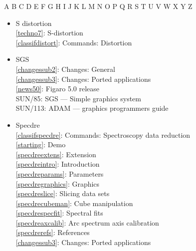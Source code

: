 \documentclass[11pt,twoside]{article}
\newcommand{\htmlref}[2]{#1}
\newcommand{\xref}[3]{#1}
\newcommand{\idxint}[2]{\ref{#1}: \htmlref{#2}{#1}}
\newcommand{\idxint}[2]{\htmlref{#2}{#1}}
\newcommand{\latorhtm}[2]{#1}
\newcommand{\latorhtm}[2]{#2}
\begin{document}
\begin{htmlonly}
\htmlref{A}{index_A}
\htmlref{B}{index_B}
\htmlref{C}{index_C}
\htmlref{D}{index_D}
\htmlref{E}{index_E}
\htmlref{F}{index_F}
\htmlref{G}{index_G}
\htmlref{H}{index_H}
\htmlref{I}{index_I}
\htmlref{J}{index_J}
\htmlref{K}{index_K}
\htmlref{L}{index_L}
\htmlref{M}{index_M}
\htmlref{N}{index_N}
\htmlref{O}{index_O}
\htmlref{P}{index_P}
\htmlref{Q}{index_Q}
\htmlref{R}{index_R}
\htmlref{S}{index_S}
T
\htmlref{U}{index_U}
\htmlref{V}{index_V}
\htmlref{W}{index_W}
\htmlref{X}{index_X}
\htmlref{Y}{index_Y}
Z
\end{htmlonly}

\begin{itemize}
\item S distortion\\
   \idxint{techno7}{S-distortion}\\
   \idxint{classifdistort}{Commands: Distortion}
\item SGS\\
   \idxint{changessub2}{Changes: General}\\
   \idxint{changessub3}{Changes: Ported applications}\\
   \idxint{news50}{Figaro 5.0 release}\\
   \xref{SUN/85: SGS \latorhtm{---}{-} Simple graphics system}{sun85}{}\\
   \xref{SUN/113: ADAM  \latorhtm{---}{-} graphics programmers guide}{sun113}{}
\item Specdre\\
   \idxint{classifspecdre}{Commands: Spectroscopy data reduction}\\
   \idxint{starting}{Demo}\\
   \idxint{specdreextens}{Extension}\\
   \idxint{specdreintro}{Introduction}\\
   \idxint{specdreparams}{Parameters}\\
   \idxint{specdregraphics}{Graphics}\\
   \idxint{specdreslice}{Slicing data sets}\\
   \idxint{specdrecubeman}{Cube manipulation}\\
   \idxint{specdrespecfit}{Spectral fits}\\
   \idxint{specdreaxcalib}{Arc spectrum axis calibration}\\
   \idxint{specdrerefs}{References}\\
   \idxint{changessub3}{Changes: Ported applications}\\

\end{itemize}
\end{document}
